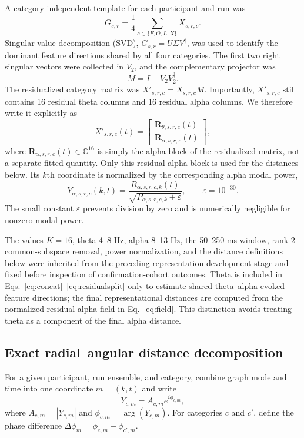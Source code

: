 \documentclass[11pt]{article}
\begin{document}
A category-independent template for each participant and run was
\begin{equation}
G_{s,r}=\frac14\sum_{c\in\{F,O,L,X\}}X_{s,r,c}.
\label{eq:common}
\end{equation}
Singular value decomposition (SVD), $G_{s,r}=U\Sigma V^\dagger$, was used to identify the dominant feature directions shared by all four categories. The first two right singular vectors were collected in $V_2$, and the complementary projector was
\begin{equation}
M=I-V_2V_2^\dagger.
\label{eq:projector}
\end{equation}
The residualized category matrix was $X'_{s,r,c}=X_{s,r,c}M$. Importantly, $X'_{s,r,c}$ still contains 16 residual theta columns and 16 residual alpha columns. We therefore write it explicitly as
\begin{equation}
X'_{s,r,c}(t)=
\begin{bmatrix}
\bm R_{\theta,s,r,c}(t)\\
\bm R_{\alpha,s,r,c}(t)
\end{bmatrix},
\label{eq:residualsplit}
\end{equation}
where $\bm R_{\alpha,s,r,c}(t)\in\mathbb C^{16}$ is simply the alpha block of the residualized matrix, not a separate fitted quantity. Only this residual alpha block is used for the distances below. Its $k$th coordinate is normalized by the corresponding alpha modal power,
\begin{equation}
Y_{\alpha,s,r,c}(k,t)=
\frac{R_{\alpha,s,r,c,k}(t)}{\sqrt{P_{\alpha,s,r,c,k}+\varepsilon}},
\qquad \varepsilon=10^{-30}.
\label{eq:field}
\end{equation}
The small constant $\varepsilon$ prevents division by zero and is numerically negligible for nonzero modal power.

The values $K=16$, theta 4--8 Hz, alpha 8--13 Hz, the 50--250 ms window, rank-2 common-subspace removal, power normalization, and the distance definitions below were inherited from the preceding representation-development stage and fixed before inspection of confirmation-cohort outcomes. Theta is included in Eqs.~\ref{eq:concat}--\ref{eq:residualsplit} only to estimate shared theta--alpha evoked feature directions; the final representational distances are computed from the normalized residual alpha field in Eq.~\ref{eq:field}. This distinction avoids treating theta as a component of the final alpha distance.

\subsection{Exact radial--angular distance decomposition}
For a given participant, run ensemble, and category, combine graph mode and time into one coordinate $m=(k,t)$ and write
\begin{equation}
Y_{c,m}=A_{c,m}e^{i\phi_{c,m}},
\end{equation}
where $A_{c,m}=|Y_{c,m}|$ and $\phi_{c,m}=\arg(Y_{c,m})$. For categories $c$ and $c'$, define the phase difference $\Delta\phi_m=\phi_{c,m}-\phi_{c',m}$.
\end{document}
